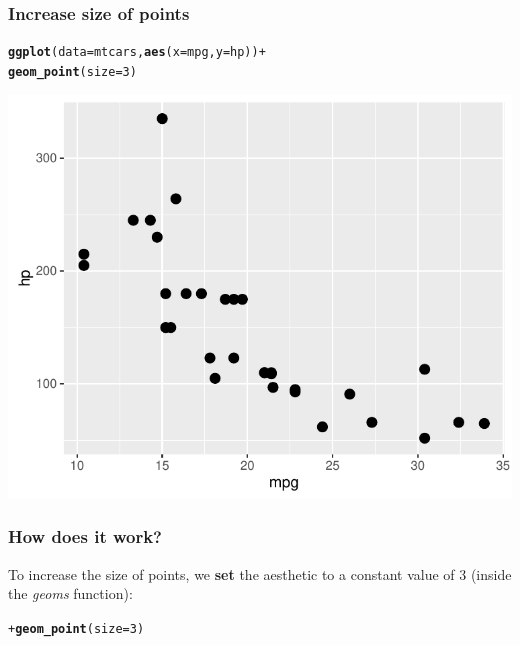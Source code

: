 \documentclass[12pt]{beamer}\usepackage[]{graphicx}\usepackage[]{color}
\makeatletter
\newcommand{\hlnum}[1]{\textcolor[rgb]{0.686,0.059,0.569}{#1}}%
\newcommand{\hlopt}[1]{\textcolor[rgb]{0,0,0}{#1}}%
\newcommand{\hlstd}[1]{\textcolor[rgb]{0.345,0.345,0.345}{#1}}%
\newcommand{\hlkwc}[1]{\textcolor[rgb]{0.333,0.667,0.333}{#1}}%
\newcommand{\hlkwd}[1]{\textcolor[rgb]{0.737,0.353,0.396}{\textbf{#1}}}%
\newenvironment{kframe}{%
 \def\at@end@of@kframe{}%
 \ifinner\ifhmode%
  \def\at@end@of@kframe{\end{minipage}}%
  \begin{minipage}{\columnwidth}%
 \fi\fi%
 \def\FrameCommand##1{\hskip\@totalleftmargin \hskip-\fboxsep
 \colorbox{shadecolor}{##1}\hskip-\fboxsep
     \hskip-\linewidth \hskip-\@totalleftmargin \hskip\columnwidth}%
 \MakeFramed {\advance\hsize-\width
   \@totalleftmargin\z@ \linewidth\hsize
   \@setminipage}}%
 {\par\unskip\endMakeFramed%
 \at@end@of@kframe}
\newenvironment{knitrout}{}{} %
\makeatother
\begin{document}
\begin{frame}[fragile]
\frametitle{Increase size of points}
\begin{knitrout}\scriptsize
{}\color{fgcolor}\begin{kframe}
\begin{alltt}
\hlkwd{ggplot}\hlstd{(}\hlkwc{data} \hlstd{= mtcars,} \hlkwd{aes}\hlstd{(}\hlkwc{x} \hlstd{= mpg,} \hlkwc{y} \hlstd{= hp))} \hlopt{+}
  \hlkwd{geom_point}\hlstd{(}\hlkwc{size} \hlstd{=} \hlnum{3}\hlstd{)}
\end{alltt}
\end{kframe}

{\centering \includegraphics[width=.7\linewidth,height=.6\linewidth]{figure/xyplot_mtcars2-1} 

}



\end{knitrout}
\end{frame}


\begin{frame}[fragile]
\frametitle{How does it work?}
To increase the size of points, we \textbf{set} the aesthetic  to a constant value of 3 (inside the \textit{geoms} function):
\begin{knitrout}\footnotesize
{}\color{fgcolor}\begin{kframe}
\begin{alltt}
\hlopt{+} \hlkwd{geom_point}\hlstd{(}\hlkwc{size} \hlstd{=} \hlnum{3}\hlstd{)}
\end{alltt}
\end{kframe}
\end{knitrout}
\end{frame}
\end{document}
